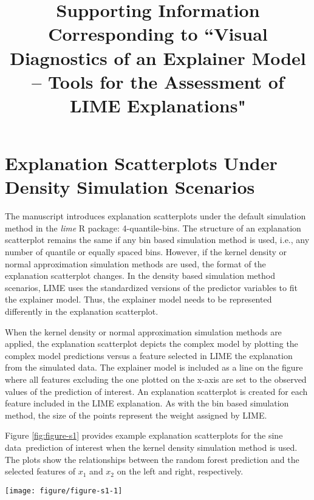 \documentclass[9pt]{article}\usepackage[]{graphicx}\usepackage[]{color}
\title{Supporting Information Corresponding to ``Visual Diagnostics of an Explainer Model -- Tools for the Assessment of LIME Explanations"}
\date{}
\newenvironment{knitrout}{}{} %
\newcommand{\data}{sine data}
\begin{document}
\maketitle



\section{Explanation Scatterplots Under Density Simulation Scenarios}

The manuscript introduces explanation scatterplots under the default simulation method in the \emph{lime} R package: 4-quantile-bins. The structure of an explanation scatterplot remains the same if any bin based simulation method is used, i.e., any number of quantile or equally spaced bins. However, if the kernel density or normal approximation simulation methods are used, the format of the explanation scatterplot changes. In the density based simulation method scenarios, LIME uses the standardized versions of the predictor variables to fit the explainer model. Thus, the explainer model needs to be represented differently in the explanation scatterplot.

When the kernel density or normal approximation simulation methods are applied, the explanation scatterplot depicts the complex model by plotting the complex model predictions versus a feature selected in LIME the explanation from the simulated data. The explainer model is included as a line on the figure where all features excluding the one plotted on the x-axis are set to the observed values of the prediction of interest. An explanation scatterplot is created for each feature included in the LIME explanation. As with the bin based simulation method, the size of the points represent the weight assigned by LIME.

Figure \ref{fig:figure-s1} provides example explanation scatterplots for the \data \ prediction of interest when the kernel density simulation method is used. The plots show the relationships between the random forest prediction and the selected features of $x_1$ and $x_2$ on the left and right, respectively.  

\vspace{0.5cm}

\renewcommand{\thefigure}{S1}
\begin{figure*}[!thp]
\begin{knitrout}
\color{fgcolor}

{\centering \texttt{[image: figure/figure-s1-1]} 

}



\end{knitrout}
\caption{Explanation scatterplots for the \data \ prediction of interest with the kernel density simulation method.}
\label{fig:figure-s1}
\end{figure*}
\end{document}
